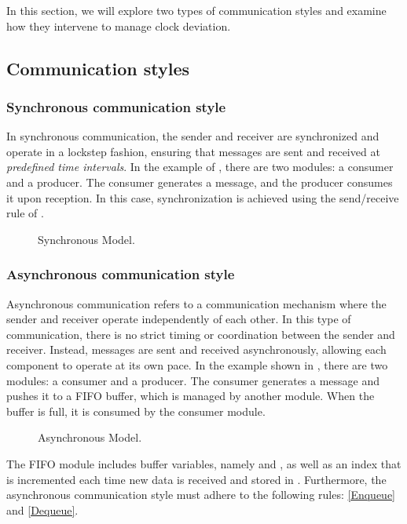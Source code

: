 In this section, we will explore two types of communication styles and examine how they intervene to manage clock deviation.

\subsection{Communication styles}

\subsubsection{Synchronous communication style}
In synchronous communication, the sender and receiver are synchronized and operate in a lockstep fashion, ensuring that messages are sent and received at \emph{predefined time intervals}. In the example of , there are two modules: a consumer and a producer. The consumer generates a message, and the producer consumes it upon reception. In this case, synchronization is achieved using the send/receive rule of .

\noindent
\begin{figure*}[!htb]
    \centering
    
    \caption{Synchronous Model.}
    \label{fig:conne:synch}
\end{figure*} 


 
\subsubsection{Asynchronous communication style}
Asynchronous communication refers to a communication mechanism where the sender and receiver operate independently of each other. In this type of communication, there is no strict timing or coordination between the sender and receiver. Instead, messages are sent and received asynchronously, allowing each component to operate at its own pace. In the example shown in , there are two modules: a consumer and a producer. The consumer generates a message and pushes it to a FIFO buffer, which is managed by another module. When the buffer is full, it is consumed by the consumer module.

\noindent
\begin{figure*}[!htb]
    \centering
    
    \caption{Asynchronous Model.}
    \label{fig:conne:asynch}
\end{figure*} 


The FIFO module includes buffer variables, namely  and , as well as an index  that is incremented each time new data is received and stored in . Furthermore, the asynchronous communication style must adhere to the following rules: \ref{Enqueue} and \ref{Dequeue}.


